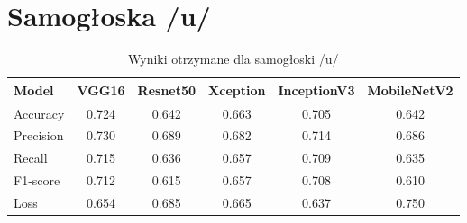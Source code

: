 \section{Samogłoska /u/}
\label{sec:samogloska-u}

\begin{table}[h]
\centering
\caption{Wyniki otrzymane dla samogłoski /u/}
\label{tab:wyniki-u}
\begin{tabular}{|l|c|c|c|c|c|}
\hline
\textbf{Model} &\textbf{VGG16} &\textbf{Resnet50} &\textbf{Xception} &\textbf{InceptionV3} &\textbf{MobileNetV2} \\ \hline
    Accuracy &0.724 &0.642 &0.663 &0.705 &0.642 \\ \hline
    Precision &0.730 &0.689 &0.682 &0.714 &0.686 \\ \hline
    Recall &0.715 &0.636 &0.657 &0.709 &0.635 \\ \hline
    F1-score &0.712 &0.615 &0.657 &0.708 &0.610 \\ \hline
    Loss &0.654 &0.685 &0.665 &0.637 &0.750 \\ \hline
\end{tabular}
\end{table}

